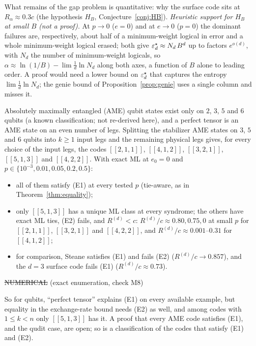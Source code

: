 \noindent What remains of the gap problem is quantitative: why the surface code sits at $R_\alpha\approx0.3c$ (the hypothesis $H_B$, Conjecture~\ref{conj:HB}).
\emph{Heuristic support for $H_B$ at small $B$ (not a proof).} At $p\to0$ ($e=0$) and at $e\to0$ ($p=0$) the dominant failures are, respectively, about half of a minimum-weight logical in error and a whole minimum-weight logical erased; both give $\varepsilon^{\star}_d\approx N_d\,B^d$ up to factors $e^{o(d)}$, with $N_d$ the number of minimum-weight logicals, so $\alpha\approx\ln(1/B)-\lim\tfrac1d\ln N_d$ along both axes, a function of $B$ alone to leading order. A proof would need a lower bound on $\varepsilon^{\star}_d$ that captures the entropy $\lim\tfrac1d\ln N_d$; the genie bound of Proposition~\ref{prop:genie} uses a single column and misses it.

\begin{observation}\label{obs:ame-codes}
Absolutely maximally entangled (AME) qubit states exist only on $2$, $3$, $5$ and $6$ qubits (a known classification; not re-derived here), and a perfect tensor is an AME state on an even number of legs. Splitting the stabilizer AME states on $3$, $5$ and $6$ qubits into $k\ge1$ input legs and the remaining physical legs gives, for every choice of the input legs, the codes $[[2,1,1]]$, $[[4,1,2]]$, $[[3,2,1]]$, $[[5,1,3]]$ and $[[4,2,2]]$. With exact ML at $e_0=0$ and $p\in\{10^{-3},0.01,0.05,0.2,0.5\}$:
\begin{itemize}
\item all of them satisfy (E1) at every tested $p$ (tie-aware, as in Theorem~\ref{thm:equality});
\item only $[[5,1,3]]$ has a unique ML class at every syndrome; the others have exact ML ties, (E2) fails, and $R^{(d)}<c$: $R^{(d)}/c\approx0.80,0.75,0$ at small $p$ for $[[2,1,1]]$, $[[3,2,1]]$ and $[[4,2,2]]$, and $R^{(d)}/c\approx0.001$--$0.31$ for $[[4,1,2]]$;
\item for comparison, Steane satisfies (E1) and fails (E2) ($R^{(d)}/c\to0.857$), and the $d=3$ surface code fails (E1) ($R^{(d)}/c\approx0.73$).
\end{itemize}
\hfill\st{NUMERICAL} (exact enumeration, check M8)
\end{observation}

\noindent So for qubits, ``perfect tensor'' explains (E1) on every available example, but equality in the exchange-rate bound needs (E2) as well, and among codes with $1\le k<n$ only $[[5,1,3]]$ has it. A proof that every AME code satisfies (E1), and the qudit case, are open; so is a classification of the codes that satisfy (E1) and (E2).
